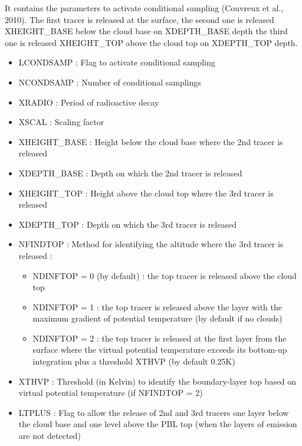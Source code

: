 It contains the parameters to activate conditional sampling (Couvreux et al., 2010).   
The first tracer is released at the surface,
the second one is released XHEIGHT\_BASE below the cloud base on XDEPTH\_BASE depth
the third one is released XHEIGHT\_TOP above the cloud top on XDEPTH\_TOP depth.
\begin{itemize}
\item LCONDSAMP :
Flag to activate conditional sampling                                          
\item NCONDSAMP :
Number of conditional samplings                                                                                                              
\item XRADIO  :
Period of radioactive decay                                    
\item XSCAL  :
Scaling factor                               
\item XHEIGHT\_BASE  :
Height below the cloud base where the 2nd tracer is released
\item XDEPTH\_BASE  :
Depth  on which the 2nd tracer is released
\item XHEIGHT\_TOP  :
Height above the cloud top where the 3rd tracer is released
\item XDEPTH\_TOP  :
Depth on which the 3rd tracer is released
\item NFINDTOP :
Method for identifying the altitude where the 3rd tracer is released :
\begin{itemize}
 \item NDINFTOP = 0 (by default) : the top tracer is released above the cloud top
 \item NDINFTOP = 1 : the top tracer is released above the layer with the maximum gradient of potential temperature (by default if no clouds)
 \item NDINFTOP = 2 : the top tracer is released at the first layer from the surface where the virtual potential temperature exceeds its bottom-up integration plus a threshold XTHVP (by default 0.25K)
\end{itemize}
\item XTHVP  :
Threshold (in Kelvin) to identify the boundary-layer top based on virtual potential temperature (if NFINDTOP = 2)
\item LTPLUS :
Flag to allow the release of 2nd and 3rd tracers one layer below the cloud base and one level above the PBL top (when the layers of emission are not detected)
\end{itemize}

